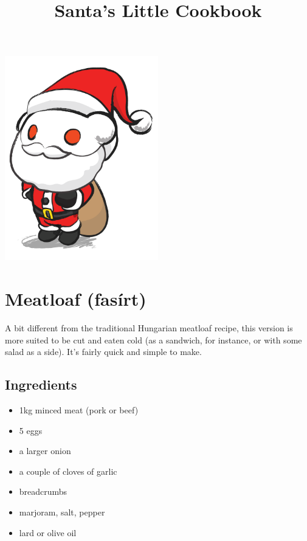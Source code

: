 \documentclass{article}
\title{Santa's Little Cookbook}
\begin{document}
\maketitle

\vspace{3cm}
\begin{center}
\includegraphics[width=0.5\textwidth]{logo}
\end{center}

\newpage
\section{Meatloaf (fasírt)}

A bit different from the traditional Hungarian meatloaf recipe, this version is more suited to be cut and eaten cold (as a sandwich, for instance, or with some salad as a side). It's fairly quick and simple to make. 

\subsection{Ingredients}
\begin{itemize}
    \item 1kg minced meat (pork or beef)
    \item 5 eggs
    \item a larger onion
    \item a couple of cloves of garlic
    \item breadcrumbs
    \item marjoram, salt, pepper
    \item lard or olive oil
\end{itemize}
\end{document}
